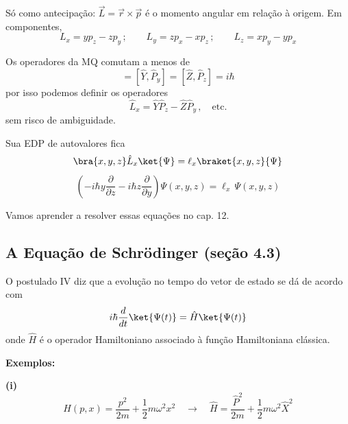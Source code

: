 Só como antecipação: $\vec{L} = \vec{r}\times\vec{p}$ é o momento angular em relação à origem. Em componentes,
\begin{equation}
    L_x = yp_z - zp_y \, ; \qquad L_y = zp_x - xp_z \, ; \qquad L_z = xp_y - yp_x
\label{eq:aula13_L_componentes}
\end{equation}

Os operadores da MQ comutam a menos de
\begin{equation}
    [\hat{X},\hat{P}_x] = [\hat{Y},\hat{P}_y] = [\hat{Z},\hat{P}_z] = i\hbar
\label{eq:aula13_comutadores_basicos}
\end{equation}
por isso podemos definir os operadores
\begin{equation}
    \hat{L}_x = \hat{Y}\hat{P}_z - \hat{Z}\hat{P}_y \, , \quad \text{etc.}
\label{eq:aula13_Lx_def}
\end{equation}
sem risco de ambiguidade.

Sua EDP de autovalores fica
\begin{equation}
    \bra{x,y,z}\hat{L}_x\ket{\Psi} = \ell_x \braket{x,y,z}{\Psi}
\label{eq:aula13_Lx_autovalor}
\end{equation}
\begin{equation}
    \left(-i\hbar y\frac{\partial}{\partial z} - i\hbar z\frac{\partial}{\partial y}\right)\Psi(x,y,z) = \ell_x\,\Psi(x,y,z)
\label{eq:aula13_Lx_EDP}
\end{equation}

Vamos aprender a resolver essas equações no cap. 12.

\subsection*{A Equação de Schrödinger (seção 4.3)}

O postulado IV diz que a evolução no tempo do vetor de estado se dá de acordo com
\begin{equation}
    i\hbar \frac{d}{dt}\ket{\Psi(t)} = \hat{H}\ket{\Psi(t)}
\label{eq:aula13_eq_schrodinger}
\end{equation}
onde $\hat{H}$ é o operador Hamiltoniano associado à função Hamiltoniana clássica.

\textbf{Exemplos:}

\textbf{(i)}
\begin{equation}
    H(p,x) = \frac{p^2}{2m} + \frac{1}{2}m\omega^2 x^2 \quad \longrightarrow \quad \hat{H} = \frac{\hat{P}^2}{2m} + \frac{1}{2}m\omega^2\hat{X}^2
\label{eq:aula13_exemplo_i}
\end{equation}

